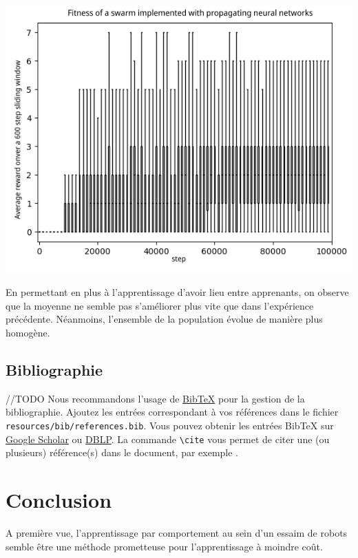 \documentclass[a4paper, 12pt]{report}
\begin{document}
\begin{center}
	\includegraphics{learner_boxplot}
\end{center}	

	En permettant en plus à l'apprentissage d'avoir lieu entre apprenants, on observe que la moyenne ne semble pas s'améliorer plus vite que dans l'expérience précédente. Néanmoins, l'ensemble de la population évolue de manière plus homogène.

    \section{Bibliographie}
//TODO
Nous recommandons l'usage de \href{https://fr.wikipedia.org/wiki/BibTeX}{BibTeX} pour la gestion de la bibliographie. Ajoutez les entrées correspondant à vos références dans le fichier \verb+resources/bib/references.bib+. Vous pouvez obtenir les entrées BibTeX sur \href{https://scholar.google.com}{Google Scholar} ou \href{https://dblp.uni-trier.de}{DBLP}. La commande \verb+\cite+ vous permet de citer une (ou plusieurs) référence(s) dans le document, par exemple \cite{pakin2020comprehensive,RusselNorvig}.

\chapter{Conclusion}

A première vue, l'apprentissage par comportement au sein d'un essaim de robots semble être une méthode prometteuse pour l'apprentissage à moindre coût.
\end{document}
